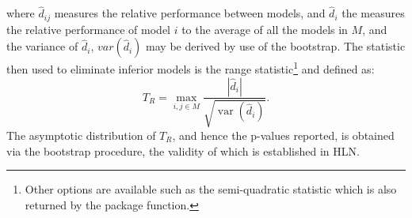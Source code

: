 where $\hat d_{ij}$ measures the relative performance between models, and $\hat d_i$ the measures the relative performance of
model $i$ to the average of all the models in $M$, and the variance of $\hat d_i$, $var(\hat d_i)$ may be derived by use of
the bootstrap. The statistic then used to eliminate inferior models is the range statistic\footnote{Other options
are available such as the semi-quadratic statistic which is also returned by
the package function.} and defined as:
\begin{equation}\label{mcs6}
{T_R} = \mathop {\max }\limits_{i,j \in M} \frac{{\left| {{{\hat d}_i}} \right|}}
{{\sqrt {\operatorname{var} \left( {{{\hat d}_i}} \right)} }}.
\end{equation}
The asymptotic distribution of $T_R$, and hence the p-values reported, is obtained via the bootstrap procedure, the validity
of which is established in HLN.


